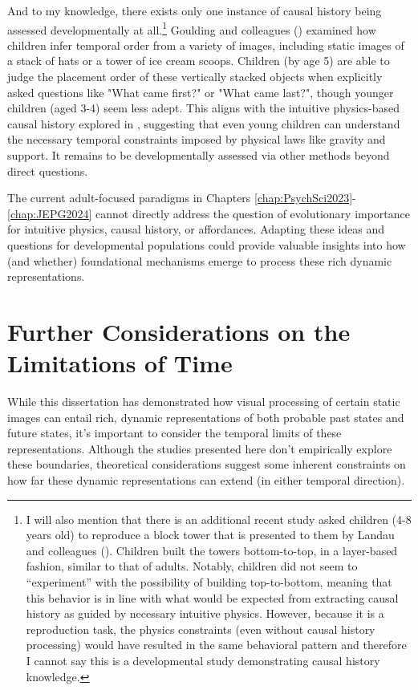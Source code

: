 And to my knowledge, there exists only one instance of causal history being assessed developmentally at all.\footnote{I will also mention that there is an additional recent study asked children (4-8 years old) to reproduce a block tower that is presented to them by Landau and colleagues (\citeyear{landau_young_2024}).  Children built the towers bottom-to-top, in a layer-based fashion, similar to that of adults.  Notably, children did not seem to “experiment” with the possibility of building top-to-bottom, meaning that this behavior is in line with what would be expected from extracting causal history as guided by necessary intuitive physics.  However, because it is a reproduction task, the physics constraints (even without causal history processing) would have resulted in the same behavioral pattern and therefore I cannot say this is a developmental study demonstrating causal history knowledge.} Goulding and colleagues (\citeyear{goulding_time_2025}) examined how children infer temporal order from a variety of images, including static images of a stack of hats or a tower of ice cream scoops. Children (by age 5) are able to judge the placement order of these vertically stacked objects when explicitly asked questions like "What came first?" or "What came last?", though younger children (aged 3-4) seem less adept. This aligns with the intuitive physics-based causal history explored in , suggesting that even young children can understand the necessary temporal constraints imposed by physical laws like gravity and support. It remains to be developmentally assessed via other methods beyond direct questions.



The current adult-focused paradigms in Chapters \ref{chap:PsychSci2023}-\ref{chap:JEPG2024} cannot directly address the question of evolutionary importance for intuitive physics, causal history, or affordances.  Adapting these ideas and questions for developmental populations could provide valuable insights into how (and whether) foundational mechanisms emerge to process these rich dynamic representations.

\section{Further Considerations on the Limitations of Time}
While this dissertation has demonstrated how visual processing of certain static images can entail rich, dynamic representations of both probable past states and future states, it's important to consider the temporal limits of these representations. Although the studies presented here don't empirically explore these boundaries, theoretical considerations suggest some inherent constraints on how far these dynamic representations can extend (in either temporal direction).
 

